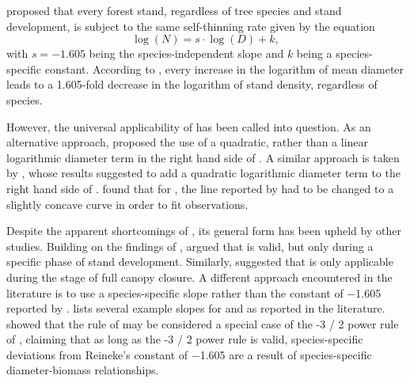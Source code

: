 \textcite{Reineke1933} proposed that every forest stand, regardless of tree species and stand development, is subject to the same self-thinning rate given by the equation
\begin{equation}
  \label{eq:Reineke}
  \log (N) = s \cdot \log (D) + k ,
\end{equation}
with \(s = -1.605\) being the species-independent slope and \(k\) being a species-specific constant.  According to \textcite{Reineke1933}, every increase in the logarithm of mean diameter leads to a \num{1.605}-fold decrease in the logarithm of stand density, regardless of species.

However, the universal applicability of  has been called into question.  As an alternative approach, \textcite{Charru2012} proposed the use of a quadratic, rather than a linear logarithmic diameter term in the right hand side of . A similar approach is taken by \textcite{Schuetz2008,Schuetz2010,Zeide1995}, whose results suggested to add a quadratic logarithmic diameter term to the right hand side of .  \textcite{Meyer1938} found that for \Ponderosa{}, the line reported by \textcite{Reineke1933} had to be changed to a slightly concave curve in order to fit observations.  

Despite the apparent shortcomings of , its general form has been upheld by other studies.  Building on the findings of \textcite{Drew1979}, \textcite{VanderSchaaf2010,VanderSchaaf2008} argued that  is valid, but only during a specific phase of stand development.  Similarly, \textcite{Zeide1985} suggested that  is only applicable during the stage of full canopy closure.  A different approach encountered in the literature is to use a species-specific slope rather than the constant of \num{-1.605} reported by \textcite{Reineke1933} \parencite{MacKinney1935,Pretzsch2005,Charru2012,Pretzsch2006,Río2001,Sterba1987,Vacchiano2013,Vospernik2015,Zeide1985,Zeide1987,VanderSchaaf2007}.   lists several example slopes for \Beech{} and \Spruce{} as reported in the literature.  \textcite{Pretzsch2000,Pretzsch2002} showed that the rule of \textcite{Reineke1933} may be considered a special case of the \num{-3 / 2} power rule of \textcite{Yoda1963}, claiming that as long as the \num{-3 / 2} power rule is valid, species-specific deviations from Reineke’s constant of \num{-1.605} are a result of species-specific diameter-biomass relationships.

